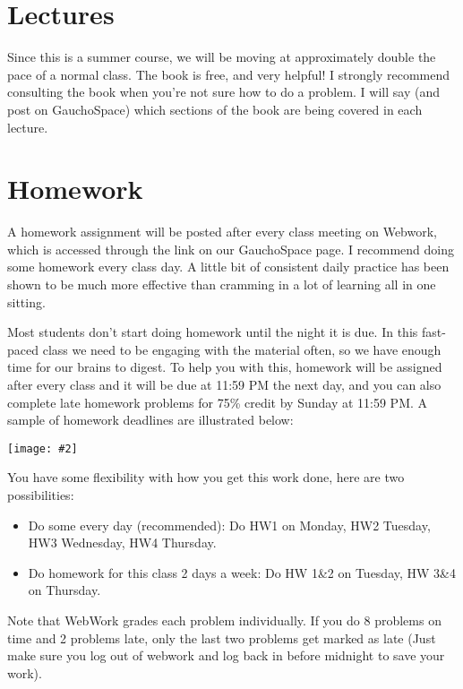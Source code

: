 \documentclass[11pt,letterpaper]{article}
\newcommand{\jpg}[2]{\begin{center}\texttt{[image: \#2]}\end{center}} %
\begin{document}
\section*{Lectures}
Since this is a summer course, we will be moving at approximately double the pace of a normal class. The book is free, and very helpful! I strongly recommend consulting the book when you're not sure how to do a problem. I will say (and post on GauchoSpace) which sections of the book are being covered in each lecture. 

\section*{Homework}
A homework assignment will be posted after every class meeting on Webwork, which is accessed through the link on our GauchoSpace page. I recommend doing some homework every class day. A little bit of consistent daily practice has been shown to be much more effective than cramming in a lot of learning all in one sitting.  

Most students don't start doing homework until the night it is due. In this fast-paced class we need to be engaging with the material often, so we have enough time for our brains to digest. To help you with this, homework will be assigned after every class and it will be due at 11:59 PM the next day, and you can also complete late homework problems for 75\% credit by Sunday at 11:59 PM. A sample of homework deadlines are illustrated below:
\jpg{width=0.8\textwidth}{homework_deadlines}

You have some flexibility with how you get this work done, here are two possibilities: 
\begin{itemize}
\item Do some every day (recommended): Do HW1 on Monday, HW2 Tuesday, HW3 Wednesday, HW4 Thursday.
\item Do homework for this class 2 days a week: Do HW 1\&2 on Tuesday, HW 3\&4 on Thursday. 
\end{itemize}

Note that WebWork grades each problem individually. If you do 8 problems on time and 2 problems late, only the last two problems get marked as late (Just make sure you log out of webwork and log back in before midnight to save your work).


\end{document}

